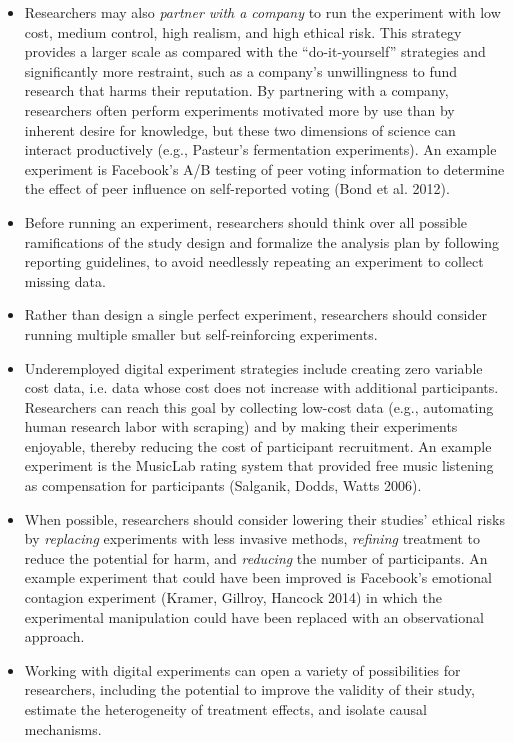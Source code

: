 \documentclass[11pt,letterpaper]{article}
\begin{document}
\begin{itemize}
\begin{enumerate}
\end{enumerate}
\item Researchers may also \emph{partner with a company} to run the experiment with low cost, medium control, high realism, and high ethical risk. This strategy provides a larger scale as compared with the ``do-it-yourself'' strategies and significantly more restraint, such as a company's unwillingness to fund research that harms their reputation. By partnering with a company, researchers often perform experiments motivated more by use than by inherent desire for knowledge, but these two dimensions of science can interact productively (e.g., Pasteur's fermentation experiments). An example experiment is Facebook's A/B testing of peer voting information to determine the effect of peer influence on self-reported voting (Bond et al. 2012).
\item Before running an experiment, researchers should think over all possible ramifications of the study design and formalize the analysis plan by following reporting guidelines, to avoid needlessly repeating an experiment to collect missing data. 
\item Rather than design a single perfect experiment, researchers should consider running multiple smaller but self-reinforcing experiments. 
\item Underemployed digital experiment strategies include creating zero variable cost data, i.e. data whose cost does not increase with additional participants. Researchers can reach this goal by collecting low-cost data (e.g., automating human research labor with scraping) and by making their experiments enjoyable, thereby reducing the cost of participant recruitment. An example experiment is the MusicLab rating system that provided free music listening as compensation for participants (Salganik, Dodds, Watts 2006).
\item When possible, researchers should consider lowering their studies' ethical risks by \emph{replacing} experiments with less invasive methods, \emph{refining} treatment to reduce the potential for harm, and \emph{reducing} the number of participants. An example experiment that could have been improved is Facebook's emotional contagion experiment (Kramer, Gillroy, Hancock 2014) in which the experimental manipulation could have been replaced with an observational approach.
\item Working with digital experiments can open a variety of possibilities for researchers, including the potential to improve the validity of their study, estimate the heterogeneity of treatment effects, and isolate causal mechanisms. 
\end{itemize} 
\end{document}

